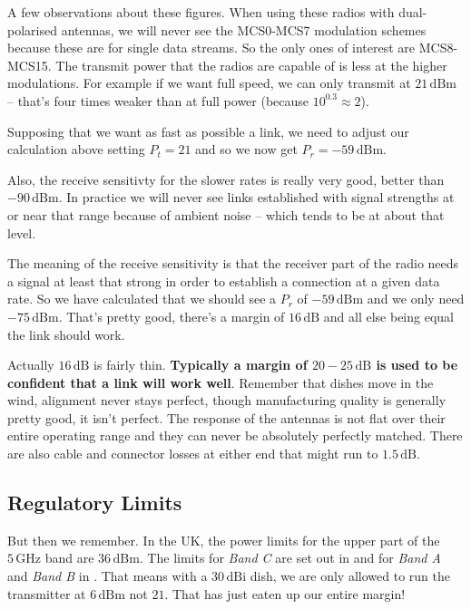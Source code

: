 A few observations about these figures. When using these radios with
dual-polarised antennas, we will never see the MCS0-MCS7 modulation
schemes because these are for single data streams. So the only ones of
interest are MCS8-MCS15. The transmit power that the radios are
capable of is less at the higher modulations. For example if we want
full speed, we can only transmit at $21\, \mathrm{dBm}$ -- that's four
times weaker than at full power (because $10^{0.3} \approx 2$). 

Supposing that we want as fast as possible a link, we need to adjust
our calculation above setting $P_t = 21$ and so we now get
$P_r = -59\, \mathrm{dBm}$.

Also, the receive sensitivty for the slower rates is really very good,
better than $-90\, \mathrm{dBm}$. In practice we will never see links
established with signal strengths at or near that range because of
ambient noise -- which tends to be at about that level.

The meaning of the receive sensitivity is that the receiver part of
the radio needs a signal at least that strong in order to establish a
connection at a given data rate. So we have calculated that we should
see a $P_r$ of $-59\, \mathrm{dBm}$ and we only need $-75\, \mathrm{dBm}$.
That's pretty good, there's a margin of $16\, \mathrm{dB}$ and all
else being equal the link should work.

Actually $16\, \mathrm{dB}$ is fairly thin. \textbf{Typically a margin
  of $20-25\, \mathrm{dB}$ is used to be confident that a link will
  work well}. Remember that dishes move in the wind, alignment never
stays perfect, though manufacturing quality is generally pretty good,
it isn't perfect. The response of the antennas is not flat over their
entire operating range and they can never be absolutely perfectly
matched. There are also cable and connector losses at either end that
might run to $1.5\, \mathrm{dB}$.

\subsection{Regulatory Limits}
\label{sec:regulatory}

But then we remember. In the UK, the power limits for the upper part
of the $5\,\mathrm{GHz}$ band are $36\, \mathrm{dBm}$. The limits for
\textit{Band C} are set out in \cite{IR2007} and for \textit{Band A}
and \textit{Band B} in \cite{IR2006}. That means with a $30\,
\mathrm{dBi}$ dish, we are only allowed to run the transmitter at $6\,
\mathrm{dBm}$ not $21$. That has just eaten up our entire margin!

